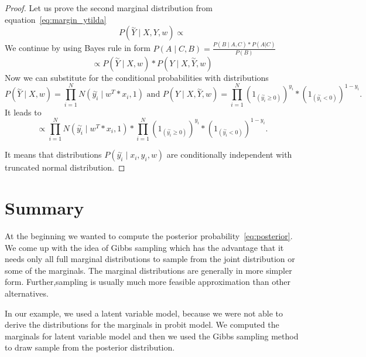 \begin{proof}
Let us prove the second marginal distribution from equation~\ref{eq:margin_ytilda} 
\begin{equation}
P(\overset{\sim}{Y} \mid X, Y, w) \propto
\end{equation}
We continue by using Bayes rule in form $ P(A \mid C, B) = \frac{P( B \mid A, C) * P(A|C)}{P(B)}$ 
\begin{equation}
    \propto P(\overset{\sim}{Y} \mid X, w) * P(Y \mid X,\overset{\sim}{Y}, w)
\end{equation}
Now we can substitute for the conditional probabilities with distributions
\begin{equation}
    P(\overset{\sim}{Y} \mid X, w) = \prod_{i=1}^{N}N(\overset{\sim}{y_i} \mid w^T*x_i, 1) \text{ and } 
    P(Y \mid X,\overset{\sim}{Y}, w) = \prod_{i=1}^{N}{(1_{(\overset{\sim}{y_i} \ge 0)})}^{y_i} * {(1_{(\overset{\sim}{y_i} < 0)})}^{1-y_i}.
\end{equation}
It leads to
\begin{equation}
    \propto \prod_{i=1}^{N}N(\overset{\sim}{y_i} \mid w^T*x_i, 1) * 
    \prod_{i=1}^{N}{(1_{(\overset{\sim}{y_i} \ge 0)})}^{y_i} * {(1_{(\overset{\sim}{y_i} < 0)})}^{1-y_i}.
\end{equation}

It means that distributions $ P(\overset{\sim}{y_i} \mid  x_i, y_i, w) $ are conditionally independent with truncated normal distribution.
\end{proof}


\section{Summary} 
\label{sec:summary}
At the beginning we wanted to compute the posterior probability~\ref{eq:posterior}. We come up with the idea of Gibbs sampling which has the advantage that it needs only all full marginal distributions to sample from the joint distribution or some of the marginals. The marginal distributions are generally in more simpler form. Further,sampling is usually much more feasible approximation than other alternatives. 

In our example, we used a latent variable model, because we were not able to derive the distributions for the marginals in probit model. We computed the marginals for latent variable model and then we used the Gibbs sampling method to draw sample from the posterior distribution.

